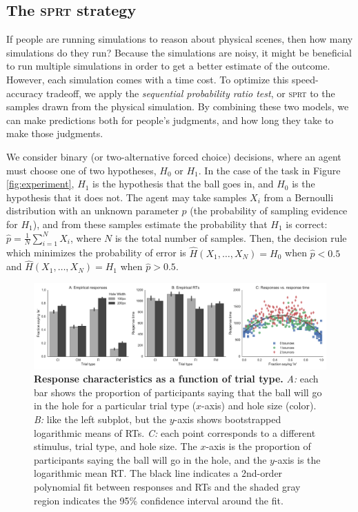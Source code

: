 \documentclass[10pt,letterpaper]{article}
\begin{document}
\subsection{The \textsc{sprt} strategy}

If people are running simulations to reason about physical scenes, then how many simulations do they run?
Because the simulations are noisy, it might be beneficial to run multiple simulations in order to get a better estimate of the outcome.
However, each simulation comes with a time cost.
To optimize this speed-accuracy tradeoff, we apply the \emph{sequential probability ratio test}, or \textsc{sprt} \cite{wald1947sequential} to the samples drawn from the physical simulation.
By combining these two models, we can make predictions both for people's judgments, and how long they take to make those judgments.

We consider binary (or two-alternative forced choice) decisions, where an agent must choose one of two hypotheses, $H_0$ or $H_1$.
In the case of the task in Figure \ref{fig:experiment}, $H_1$ is the hypothesis that the ball goes in, and $H_0$ is the hypothesis that it does not. 
The agent may take samples $X_i$ from a Bernoulli distribution with an unknown parameter $p$ (the probability of sampling evidence for $H_1$), and from these samples estimate the probability that $H_1$ is correct: $\hat{p}=\frac{1}{N}\sum_{i=1}^N X_i$, where $N$ is the total number of samples. 
Then, the decision rule which minimizes the probability of error is $\hat{H}(X_1,\ldots{},X_N)=H_0$ when $\hat{p}<0.5$ and $\hat{H}(X_1,\ldots{},X_N)=H_1$ when $\hat{p}>0.5$.

\begin{figure}[t]
    \begin{center}
        \includegraphics[width=\textwidth]{figures/hole_empirical_results.pdf}
        \caption{\textbf{Response characteristics as a function of trial type.}
        \emph{A:} each bar shows the proportion of participants saying that the ball will go in the hole for a particular trial type ($x$-axis) and hole size (color).
        \emph{B:} like the left subplot, but the $y$-axis shows bootstrapped logarithmic means of RTs. 
        \emph{C:} each point corresponds to a different stimulus, trial type, and hole size.  
        The $x$-axis is the proportion of participants saying the ball will go in the hole, and the $y$-axis is the logarithmic mean RT. 
        The black line indicates a 2nd-order polynomial fit between responses and RTs and the shaded gray region indicates the 95\% confidence interval around the fit.}
        \label{fig:pct-vs-rt}
    \end{center}
\end{figure}
\end{document}
